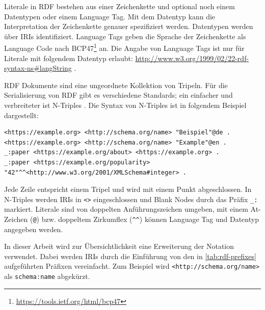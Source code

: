 Literale in RDF bestehen aus einer Zeichenkette und optional noch einem Datentypen oder einem Language Tag.
Mit dem Datentyp kann die Interpretation der Zeichenkette genauer spezifiziert werden.
Datentypen werden über IRIs identifiziert.
Language Tags geben die Sprache der Zeichenkette als Language Code nach BCP47\footnote{\url{https://tools.ietf.org/html/bcp47}} an.
Die Angabe von Language Tags ist nur für Literale mit folgendem Datentyp erlaubt: \url{http://www.w3.org/1999/02/22-rdf-syntax-ns#langString} \cite{rdf-spec} .

RDF Dokumente sind eine ungeordnete Kollektion von Tripeln.
Für die Serialisierung von RDF gibt es verschiedene Standards; ein einfacher und verbreiteter ist N-Triples \cite{rdf-ntriples}.
Die Syntax von N-Triples ist in folgendem Beispiel dargestellt:
\begin{lstlisting}[language=SPARQL, breaklines=true]
<https://example.org> <http://schema.org/name> "Beispiel"@de .
<https://example.org> <http://schema.org/name> "Example"@en .
_:paper <https://example.org/about> <https://example.org> .
_:paper <https://example.org/popularity> "42"^^<http://www.w3.org/2001/XMLSchema#integer> .
\end{lstlisting}
Jede Zeile entspricht einem Tripel und wird mit einem Punkt abgeschlossen.
In N-Triples werden IRIs in \verb|<>| eingeschlossen und Blank Nodes durch das Präfix \verb|_:| markiert.
Literale sind von doppelten Anführungszeichen umgeben, mit einem At-Zeichen (\verb|@|) bzw. doppeltem Zirkumflex (\verb|^^|) können Language Tag und Datentyp angegeben werden.

In dieser Arbeit wird zur Übersichtlichkeit eine Erweiterung der Notation verwendet.
Dabei werden IRIs durch die Einführung von den in \cref{tab:rdf-prefixes} aufgeführten Präfixen vereinfacht.
Zum Beispiel wird \verb|<http://schema.org/name>| als \verb|schema:name| abgekürzt. 


